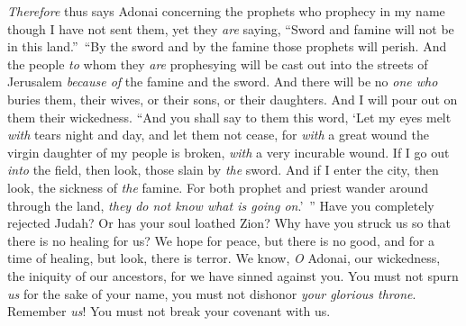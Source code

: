 \begin{biblechapter}
\verse \textit{Therefore} thus says Adonai concerning the prophets who prophecy in my name though I have not sent them, yet they \textit{are} saying, “Sword and famine will not be in this land.” “By the sword and by the famine those prophets will perish.
\verse And the people \textit{to} whom they \textit{are} prophesying will be cast out into the streets of Jerusalem \textit{because of} the famine and the sword. And there will be no \textit{one who} buries them, their wives, or their sons, or their daughters. And I will pour out on them their wickedness.
 “And you shall say to them this word,
\verse ‘Let my eyes melt \textit{with} tears night and day, 
and let them not cease, 
for \textit{with} a great wound the virgin daughter of my people is broken, 
\textit{with} a very incurable wound.
\verse If I go out \textit{into} the field, 
then look, those slain by \textit{the} sword. 
And if I enter the city, 
then look, the sickness of \textit{the} famine. 
For both prophet and priest wander around through the land, 
\textit{they do not know what is going on}.’ ”
\verse Have you completely rejected Judah? 
Or has your soul loathed Zion? 
Why have you struck us 
so that there is no healing for us? 
We hope for peace, but there is no good, 
and for a time of healing, but look, there is terror.
\verse We know, \textit{O} Adonai, our wickedness, 
the iniquity of our ancestors, 
for we have sinned against you.
\verse You must not spurn \textit{us} for the sake of your name, 
you must not dishonor \textit{your glorious throne}. 
Remember \textit{us}! 
You must not break your covenant with us.
\end{biblechapter}


